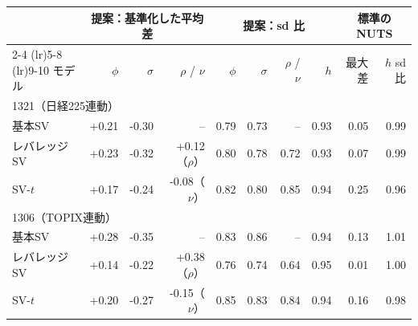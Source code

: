 \begin{tabular}{lrrrrrrrrr}
\toprule
 & \multicolumn{3}{c}{提案：基準化した平均差} & \multicolumn{4}{c}{提案：sd 比} & \multicolumn{2}{c}{標準の NUTS} \\
\cmidrule(lr){2-4} \cmidrule(lr){5-8} \cmidrule(lr){9-10}
モデル & $\phi$ & $\sigma$ & $\rho$ / $\nu$ & $\phi$ & $\sigma$ & $\rho$ / $\nu$ & $h$ & 最大差 & $h$ sd 比 \\
\midrule
\multicolumn{10}{l}{1321（日経225連動）} \\
基本SV & +0.21 & -0.30 & -- & 0.79 & 0.73 & -- & 0.93 & 0.05 & 0.99 \\
レバレッジSV & +0.23 & -0.32 & +0.12（$\rho$） & 0.80 & 0.78 & 0.72 & 0.93 & 0.07 & 0.99 \\
SV-$t$ & +0.17 & -0.24 & -0.08（$\nu$） & 0.82 & 0.80 & 0.85 & 0.94 & 0.25 & 0.96 \\
\midrule
\multicolumn{10}{l}{1306（TOPIX連動）} \\
基本SV & +0.28 & -0.35 & -- & 0.83 & 0.86 & -- & 0.94 & 0.13 & 1.01 \\
レバレッジSV & +0.14 & -0.22 & +0.38（$\rho$） & 0.76 & 0.74 & 0.64 & 0.95 & 0.01 & 1.00 \\
SV-$t$ & +0.20 & -0.27 & -0.15（$\nu$） & 0.85 & 0.83 & 0.84 & 0.94 & 0.16 & 0.98 \\
\bottomrule
\end{tabular}
